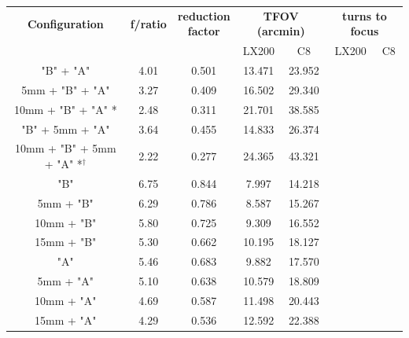 \documentclass[12pt,titlepage]{article}
\begin{document}
\begin{appendix}
\begin{center}  
\small{
\begin{tabular}{|c|c|c|c|c|c|c|}
	\hline
	\textbf{Configuration} & \textbf{f/ratio} & \thead{\bf reduction\\ \bf factor} & \multicolumn{2}{c|}{\textbf{TFOV (arcmin)}} & \multicolumn{2}{c|}{\textbf{turns to focus}}  \\
										&			&			&	LX200	&	C8		&	LX200	& 	C8 \\ [-1ex]
	\hline
	"B" + "A" 		 					&	4.01		&	0.501	& 	13.471	&	23.952	&			&		\\ [-1ex]
	\hline
	5mm + "B" + "A" 	  					&	3.27		&	0.409	& 	16.502	&	29.340	&			&		\\ [-1ex]
	\hline
	10mm + "B" + "A" *  					&	2.48		&	0.311	& 	21.701	&	38.585	&			&		\\ [-1ex]
	\hline
	"B" + 5mm + "A"   					&	3.64		&	0.455	& 	14.833	&	26.374	&			&		\\ [-1ex]
	\hline
	10mm + "B" + 5mm + "A" *$^{\dagger}$ &	2.22		&	0.277	& 	24.365	&	43.321	&			&		\\ [-1ex]
	\hline
	"B" 									&	6.75		&	0.844	& 	7.997	&	14.218	&			&		\\ [-1ex]
	\hline
	5mm + "B"							&	6.29		&	0.786	& 	8.587	&	15.267	&			&		\\ [-1ex]
	\hline
	10mm + "B"							&	5.80		&	0.725	& 	9.309	&	16.552	&			&		\\ [-1ex]
	\hline
	15mm + "B"							&	5.30 	&	0.662	& 	10.195	&	18.127	&			&		\\ [-1ex]
	\hline
	"A" 									&	5.46		&	0.683	& 	9.882	&	17.570	&			&		\\ [-1ex]
	\hline
	5mm + "A" 							&	5.10 	&	0.638	& 	10.579	&	18.809	&			&		\\ [-1ex]
	\hline
	10mm + "A"							&	4.69 	&	0.587	& 	11.498	&	20.443	&			&		\\ [-1ex]
	\hline
	15mm + "A"							&	4.29		&	0.536	& 	12.592	&	22.388	&			&		\\ 
	\hline
\end{tabular}}\\
				\label{tab:focal_reduction} 
\vspace{.4 cm}
\end{center}




\end{appendix}
\end{document}
